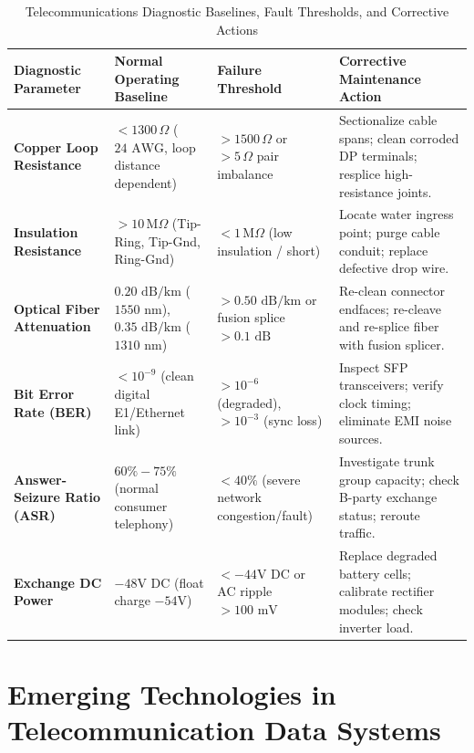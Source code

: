 \documentclass[12pt,a4paper]{report}
\begin{document}
\begin{table}[H]
\centering
\footnotesize
\renewcommand{\arraystretch}{1.3}
\begin{tabularx}{\textwidth}{|>{\raggedright\arraybackslash}p{2.6cm}|>{\raggedright\arraybackslash}p{2.6cm}|>{\raggedright\arraybackslash}p{2.8cm}|>{\raggedright\arraybackslash}X|}
\hline
\textbf{Diagnostic Parameter} & \textbf{Normal Operating Baseline} & \textbf{Failure Threshold} & \textbf{Corrective Maintenance Action} \\ \hline
\textbf{Copper Loop Resistance} & $<1300\,\Omega$ ($24\text{ AWG}$, loop distance dependent) & $>1500\,\Omega$ or $>5\,\Omega$ pair imbalance & Sectionalize cable spans; clean corroded DP terminals; resplice high-resistance joints. \\ \hline
\textbf{Insulation Resistance} & $>10\,\text{M}\Omega$ (Tip-Ring, Tip-Gnd, Ring-Gnd) & $<1\,\text{M}\Omega$ (low insulation / short) & Locate water ingress point; purge cable conduit; replace defective drop wire. \\ \hline
\textbf{Optical Fiber Attenuation} & $0.20\text{ dB/km}$ ($1550\text{ nm}$), $0.35\text{ dB/km}$ ($1310\text{ nm}$) & $>0.50\text{ dB/km}$ or fusion splice $>0.1\text{ dB}$ & Re-clean connector endfaces; re-cleave and re-splice fiber with fusion splicer. \\ \hline
\textbf{Bit Error Rate (BER)} & $<10^{-9}$ (clean digital E1/Ethernet link) & $>10^{-6}$ (degraded), $>10^{-3}$ (sync loss) & Inspect SFP transceivers; verify clock timing; eliminate EMI noise sources. \\ \hline
\textbf{Answer-Seizure Ratio (ASR)} & $60\% - 75\%$ (normal consumer telephony) & $<40\%$ (severe network congestion/fault) & Investigate trunk group capacity; check B-party exchange status; reroute traffic. \\ \hline
\textbf{Exchange DC Power} & $-48\text{V DC}$ (float charge $-54\text{V}$) & $<-44\text{V DC}$ or AC ripple $>100\text{ mV}$ & Replace degraded battery cells; calibrate rectifier modules; check inverter load. \\ \hline
\end{tabularx}
\caption{Telecommunications Diagnostic Baselines, Fault Thresholds, and Corrective Actions}
\label{tab:maintenance_metrics}
\end{table}

\chapter{Emerging Technologies in Telecommunication Data Systems}
\end{document}
